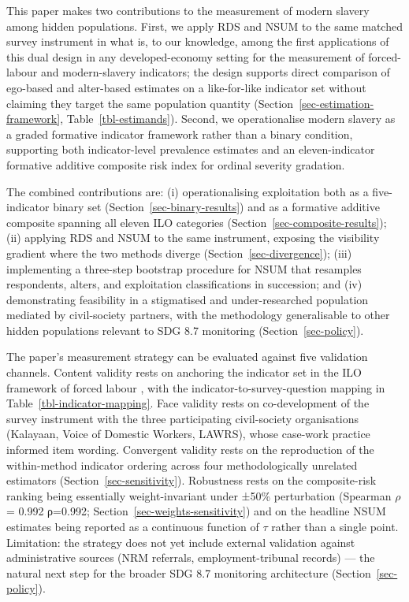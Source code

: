 \documentclass[
  12pt,
  letterpaper,
  DIV=11,
  numbers=noendperiod]{scrartcl}
\begin{document}
This paper makes two contributions to the measurement of modern slavery
among hidden populations. First, we apply RDS and NSUM to the same
matched survey instrument in what is, to our knowledge, among the first
applications of this dual design in any developed-economy setting for
the measurement of forced-labour and modern-slavery indicators; the
design supports direct comparison of ego-based and alter-based estimates
on a like-for-like indicator set without claiming they target the same
population quantity (Section~\ref{sec-estimation-framework},
Table~\ref{tbl-estimands}). Second, we operationalise modern slavery as
a graded formative indicator framework rather than a binary condition,
supporting both indicator-level prevalence estimates and an
eleven-indicator formative additive composite risk index for ordinal
severity gradation.

The combined contributions are: (i) operationalising exploitation both
as a five-indicator binary set (Section~\ref{sec-binary-results}) and as
a formative additive composite spanning all eleven ILO categories
(Section~\ref{sec-composite-results}); (ii) applying RDS and NSUM to the
same instrument, exposing the visibility gradient where the two methods
diverge (Section~\ref{sec-divergence}); (iii) implementing a three-step
bootstrap procedure for NSUM that resamples respondents, alters, and
exploitation classifications in succession; and (iv) demonstrating
feasibility in a stigmatised and under-researched population mediated by
civil-society partners, with the methodology generalisable to other
hidden populations relevant to SDG 8.7 monitoring
(Section~\ref{sec-policy}).

The paper's measurement strategy can be evaluated against five
validation channels. Content validity rests on anchoring the indicator
set in the ILO framework of forced labour
\autocite*{ILO11-indicators,hard24-ilo,int25-ilo}, with the
indicator-to-survey-question mapping in
Table~\ref{tbl-indicator-mapping}. Face validity rests on co-development
of the survey instrument with the three participating civil-society
organisations (Kalayaan, Voice of Domestic Workers, LAWRS), whose
case-work practice informed item wording. Convergent validity rests on
the reproduction of the within-method indicator ordering across four
methodologically unrelated estimators (Section~\ref{sec-sensitivity}).
Robustness rests on the composite-risk ranking being essentially
weight-invariant under ±50\% perturbation (Spearman \(\rho\) = 0.992
ρ=0.992; Section~\ref{sec-weights-sensitivity}) and on the headline NSUM
estimates being reported as a continuous function of \(\tau\) rather
than a single point. Limitation: the strategy does not yet include
external validation against administrative sources (NRM referrals,
employment-tribunal records) --- the natural next step for the broader
SDG 8.7 monitoring architecture (Section~\ref{sec-policy}).
\end{document}
